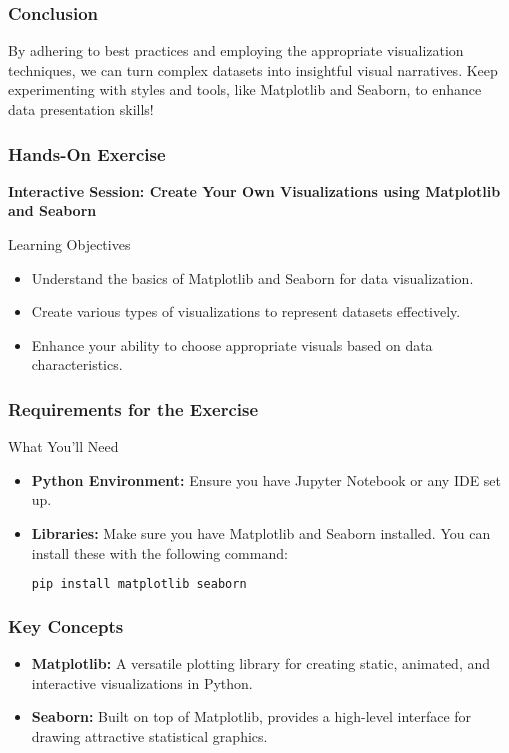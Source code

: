 \documentclass[aspectratio=169]{beamer}
\begin{document}
\begin{frame}[fragile]
  \frametitle{Conclusion}
  By adhering to best practices and employing the appropriate visualization techniques, we can turn complex datasets into insightful visual narratives. Keep experimenting with styles and tools, like Matplotlib and Seaborn, to enhance data presentation skills!
\end{frame}

\begin{frame}
    \frametitle{Hands-On Exercise}
    \textbf{Interactive Session: Create Your Own Visualizations using Matplotlib and Seaborn}

    \begin{block}{Learning Objectives}
        \begin{itemize}
            \item Understand the basics of Matplotlib and Seaborn for data visualization.
            \item Create various types of visualizations to represent datasets effectively.
            \item Enhance your ability to choose appropriate visuals based on data characteristics.
        \end{itemize}
    \end{block}
\end{frame}

\begin{frame}
    \frametitle{Requirements for the Exercise}
    \begin{block}{What You'll Need}
        \begin{itemize}
            \item \textbf{Python Environment:} Ensure you have Jupyter Notebook or any IDE set up.
            \item \textbf{Libraries:} Make sure you have Matplotlib and Seaborn installed. You can install these with the following command:
            \begin{lstlisting}[language=bash]
pip install matplotlib seaborn
            \end{lstlisting}
        \end{itemize}
    \end{block}
\end{frame}

\begin{frame}[fragile]
    \frametitle{Key Concepts}
    \begin{itemize}
        \item \textbf{Matplotlib:} A versatile plotting library for creating static, animated, and interactive visualizations in Python.
        \item \textbf{Seaborn:} Built on top of Matplotlib, provides a high-level interface for drawing attractive statistical graphics.
    \end{itemize}
\end{frame}
\end{document}
